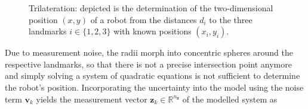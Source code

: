 \begin{figure}[t]
\centering
{}
\caption[Determination of the two-dimensional position of a robot given the known positions of three landmarks.]{Trilateration: depicted is the determination of the two-dimensional position $(x, y)$ of a robot from the distances $d_i$ to the three landmarks $i \in \{1, 2, 3\}$ with known positions $(x_i, y_i)$.}
	\label{fig:trilateration}
\end{figure}

Due to measurement noise, the radii morph into concentric spheres around the respective landmarks, so that there is not a precise intersection point anymore and simply solving a system of quadratic equations is not sufficient to determine the robot's position. Incorporating the uncertainty into the model using the noise term $\bm{v}_k $ yields the measurement vector $\bm{z}_k \in \mathbb{R}^{n_{\bm{z}}}$ of the modelled system as

